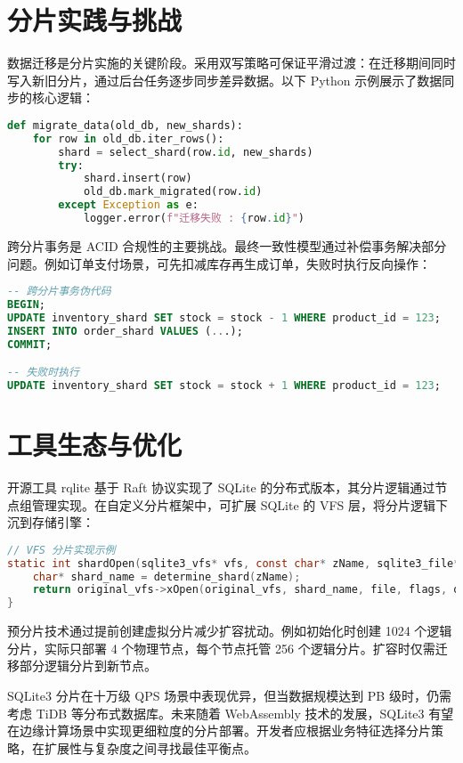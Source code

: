 \chapter{分片实践与挑战}
数据迁移是分片实施的关键阶段。采用双写策略可保证平滑过渡：在迁移期间同时写入新旧分片，通过后台任务逐步同步差异数据。以下 Python 示例展示了数据同步的核心逻辑：\par
\begin{lstlisting}[language=python]
def migrate_data(old_db, new_shards):
    for row in old_db.iter_rows():
        shard = select_shard(row.id, new_shards)
        try:
            shard.insert(row)
            old_db.mark_migrated(row.id)
        except Exception as e:
            logger.error(f"迁移失败 : {row.id}")
\end{lstlisting}
跨分片事务是 ACID 合规性的主要挑战。最终一致性模型通过补偿事务解决部分问题。例如订单支付场景，可先扣减库存再生成订单，失败时执行反向操作：\par
\begin{lstlisting}[language=sql]
-- 跨分片事务伪代码
BEGIN;
UPDATE inventory_shard SET stock = stock - 1 WHERE product_id = 123;
INSERT INTO order_shard VALUES (...);
COMMIT;

-- 失败时执行
UPDATE inventory_shard SET stock = stock + 1 WHERE product_id = 123;
\end{lstlisting}
\chapter{工具生态与优化}
开源工具 rqlite 基于 Raft 协议实现了 SQLite 的分布式版本，其分片逻辑通过节点组管理实现。在自定义分片框架中，可扩展 SQLite 的 VFS 层，将分片逻辑下沉到存储引擎：\par
\begin{lstlisting}[language=c]
// VFS 分片实现示例
static int shardOpen(sqlite3_vfs* vfs, const char* zName, sqlite3_file* file, int flags, int* outFlags){
    char* shard_name = determine_shard(zName);
    return original_vfs->xOpen(original_vfs, shard_name, file, flags, outFlags);
}
\end{lstlisting}
预分片技术通过提前创建虚拟分片减少扩容扰动。例如初始化时创建 1024 个逻辑分片，实际只部署 4 个物理节点，每个节点托管 256 个逻辑分片。扩容时仅需迁移部分逻辑分片到新节点。\par
SQLite3 分片在十万级 QPS 场景中表现优异，但当数据规模达到 PB 级时，仍需考虑 TiDB 等分布式数据库。未来随着 WebAssembly 技术的发展，SQLite3 有望在边缘计算场景中实现更细粒度的分片部署。开发者应根据业务特征选择分片策略，在扩展性与复杂度之间寻找最佳平衡点。\par
